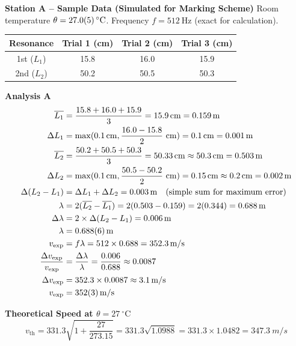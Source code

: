 \documentclass[11pt]{article}
\newcounter{popsec}
\newcounter{popsub}
\newcommand{\courssub}[1]{%
  \stepcounter{popsub}%
  \par\vspace{9pt}\noindent{\popxbold\fontsize{11.5}{13}\selectfont\color{popink}{\color{poporange}\thepopsec.\thepopsub}\hspace{6pt}#1}\par\nopagebreak\vspace{4pt}
}
\begin{document}
\courssub{Model Answer}
\begin{exoresolu}
\textbf{Station A -- Sample Data (Simulated for Marking Scheme)}
Room temperature $\theta = \SI{27.0 \pm 0.5}{\ensuremath{{}^{\circ}\mathrm{C}}}$.
Frequency $f = \SI{512}{\hertz}$ (exact for calculation).

\begin{center}
\begin{tabular}{|c|c|c|c|}
\hline
\rowcolor{popblueL}
Resonance & Trial 1 (cm) & Trial 2 (cm) & Trial 3 (cm) \\
\hline
1st ($L_1$) & 15.8 & 16.0 & 15.9 \\
2nd ($L_2$) & 50.2 & 50.5 & 50.3 \\
\hline
\end{tabular}
\end{center}

\textbf{Analysis A}
\begin{align*}
\overline{L_1} &= \frac{15.8+16.0+15.9}{3} = \SI{15.9}{cm} = \SI{0.159}{m} \\
\Delta L_1 &= \max(\SI{0.1}{cm}, \frac{16.0-15.8}{2}\ \text{cm}) = \SI{0.1}{cm} = \SI{0.001}{m} \\
\overline{L_2} &= \frac{50.2+50.5+50.3}{3} = \SI{50.33}{cm} \approx \SI{50.3}{cm} = \SI{0.503}{m} \\
\Delta L_2 &= \max(\SI{0.1}{cm}, \frac{50.5-50.2}{2}\ \text{cm}) = \SI{0.15}{cm} \approx \SI{0.2}{cm} = \SI{0.002}{m} \\
\Delta(L_2 - L_1) &= \Delta L_1 + \Delta L_2 = \SI{0.003}{m} \quad \text{(simple sum for maximum error)} \\
\lambda &= 2(\overline{L_2} - \overline{L_1}) = 2(0.503 - 0.159) = 2(0.344) = \SI{0.688}{m} \\
\Delta \lambda &= 2 \times \Delta(L_2 - L_1) = \SI{0.006}{m} \\
\lambda &= \SI{0.688 \pm 0.006}{m} \\
v_{\text{exp}} &= f\lambda = 512 \times 0.688 = \SI{352.3}{m/s} \\
\frac{\Delta v_{\text{exp}}}{v_{\text{exp}}} &= \frac{\Delta \lambda}{\lambda} = \frac{0.006}{0.688} \approx 0.0087 \\
\Delta v_{\text{exp}} &= 352.3 \times 0.0087 \approx \SI{3.1}{m/s} \\
v_{\text{exp}} &= \SI{352 \pm 3}{m/s}
\end{align*}

\textbf{Theoretical Speed at $\theta = \SI{27}{\ensuremath{{}^{\circ}\mathrm{C}}}$}
\[ v_{\text{th}} = 331.3 \sqrt{1 + \frac{27}{273.15}} = 331.3 \sqrt{1.0988} = 331.3 \times 1.0482 = \SI{347.3}{m/s} \]


\end{exoresolu}
\end{document}
